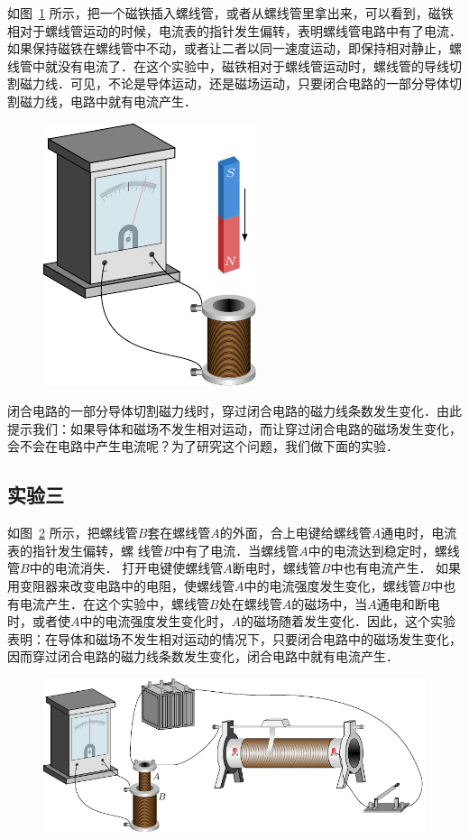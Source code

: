 如图~\ref{fig_C_2-2} 所示，把一个磁铁插入螺线管，或者从螺线管里拿出来，可以看到，磁铁相对于螺线管运动的时候，电流表的指针发生偏转，表明螺线管电路中有了电流．如果保持磁铁在螺线管中不动，或者让二者以同一速度运动，即保持相对静止，螺线管中就没有电流了．在这个实验中，磁铁相对于螺线管运动时，螺线管的导线切割磁力线．可见，不论是导体运动，还是磁场运动，只要闭合电路的一部分导体切割磁力线，电路中就有电流产生．
\begin{figure}[htbp]
    \centering
    \includegraphics{fig/C/2-2.pdf}
    \caption{}\label{fig_C_2-2}
\end{figure}

闭合电路的一部分导体切割磁力线时，穿过闭合电路的磁力线条数发生变化．由此提示我们：如果导体和磁场不发生相对运动，而让穿过闭合电路的磁场发生变化，会不会在电路中产生电流呢？为了研究这个问题，我们做下面的实验．

\subsection*{实验三}

如图~\ref{fig_C_2-3} 所示，把螺线管$B$套在螺线管$A$的外面，合上电键给螺线管$A$通电时，电流表的指针发生偏转，螺
线管$B$中有了电流．当螺线管$A$中的电流达到稳定时，螺线管$B$中的电流消失．
打开电键使螺线管$A$断电时，螺线管$B$中也有电流产生．
如果用变阻器来改变电路中的电阻，使螺线管$A$中的电流强度发生变化，螺线管$B$中也有电流产生．在这个实验中，螺线管$B$处在螺线管$A$的磁场中，当$A$通电和断电时，或者使$A$中的电流强度发生变化时，$A$的磁场随着发生变化．因此，这个实验表明：在导体和磁场不发生相对运动的情况下，只要闭合电路中的磁场发生变化，因而穿过闭合电路的磁力线条数发生变化，闭合电路中就有电流产生．
\begin{figure}[htbp]
    \centering
    \includegraphics{fig/C/2-3.pdf}
    \caption{}\label{fig_C_2-3}
\end{figure}

